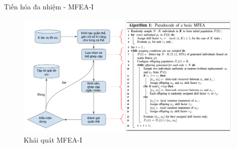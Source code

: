     \begin{frame}{Tiến hóa đa nhiệm - MFEA-I}
		\begin{figure}[h!]
            \centering
            \includegraphics[width=1.0\linewidth]{images/mfeai_vi.png}
            \caption{\small{Khái quát MFEA-I}}
            \label{fig:mfeaii}
        \end{figure}
	\end{frame}
	
